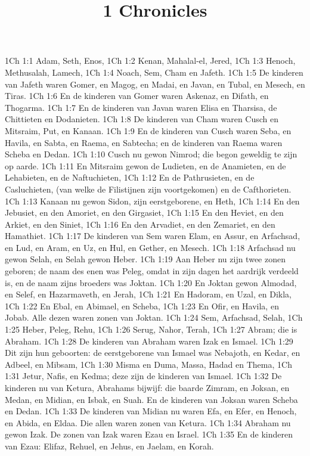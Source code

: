 

\title{1 Chronicles}


1Ch 1:1  Adam, Seth, Enos,
1Ch 1:2  Kenan, Mahalal-el, Jered,
1Ch 1:3  Henoch, Methusalah, Lamech,
1Ch 1:4  Noach, Sem, Cham en Jafeth.
1Ch 1:5  De kinderen van Jafeth waren Gomer, en Magog, en Madai, en Javan, en Tubal, en Mesech, en Tiras.
1Ch 1:6  En de kinderen van Gomer waren Askenaz, en Difath, en Thogarma.
1Ch 1:7  En de kinderen van Javan waren Elisa en Tharsisa, de Chittieten en Dodanieten.
1Ch 1:8  De kinderen van Cham waren Cusch en Mitsraim, Put, en Kanaan.
1Ch 1:9  En de kinderen van Cusch waren Seba, en Havila, en Sabta, en Raema, en Sabtecha; en de kinderen van Raema waren Scheba en Dedan.
1Ch 1:10  Cusch nu gewon Nimrod; die begon geweldig te zijn op aarde.
1Ch 1:11  En Mitsraim gewon de Ludieten, en de Anamieten, en de Lehabieten, en de Naftuchieten,
1Ch 1:12  En de Pathrusieten, en de Casluchieten, (van welke de Filistijnen zijn voortgekomen) en de Cafthorieten.
1Ch 1:13  Kanaan nu gewon Sidon, zijn eerstgeborene, en Heth,
1Ch 1:14  En den Jebusiet, en den Amoriet, en den Girgasiet,
1Ch 1:15  En den Heviet, en den Arkiet, en den Siniet,
1Ch 1:16  En den Arvadiet, en den Zemariet, en den Hamathiet.
1Ch 1:17  De kinderen van Sem waren Elam, en Assur, en Arfachsad, en Lud, en Aram, en Uz, en Hul, en Gether, en Mesech.
1Ch 1:18  Arfachsad nu gewon Selah, en Selah gewon Heber.
1Ch 1:19  Aan Heber nu zijn twee zonen geboren; de naam des enen was Peleg, omdat in zijn dagen het aardrijk verdeeld is, en de naam zijns broeders was Joktan.
1Ch 1:20  En Joktan gewon Almodad, en Selef, en Hazarmaveth, en Jerah,
1Ch 1:21  En Hadoram, en Uzal, en Dikla,
1Ch 1:22  En Ebal, en Abimael, en Scheba,
1Ch 1:23  En Ofir, en Havila, en Jobab. Alle dezen waren zonen van Joktan.
1Ch 1:24  Sem, Arfachsad, Selah,
1Ch 1:25  Heber, Peleg, Rehu,
1Ch 1:26  Serug, Nahor, Terah,
1Ch 1:27  Abram; die is Abraham.
1Ch 1:28  De kinderen van Abraham waren Izak en Ismael.
1Ch 1:29  Dit zijn hun geboorten: de eerstgeborene van Ismael was Nebajoth, en Kedar, en Adbeel, en Mibsam,
1Ch 1:30  Misma en Duma, Massa, Hadad en Thema,
1Ch 1:31  Jetur, Nafis, en Kedma; deze zijn de kinderen van Ismael.
1Ch 1:32  De kinderen nu van Ketura, Abrahams bijwijf: die baarde Zimram, en Joksan, en Medan, en Midian, en Isbak, en Suah. En de kinderen van Joksan waren Scheba en Dedan.
1Ch 1:33  De kinderen van Midian nu waren Efa, en Efer, en Henoch, en Abida, en Eldaa. Die allen waren zonen van Ketura.
1Ch 1:34  Abraham nu gewon Izak. De zonen van Izak waren Ezau en Israel.
1Ch 1:35  En de kinderen van Ezau: Elifaz, Rehuel, en Jehus, en Jaelam, en Korah.
